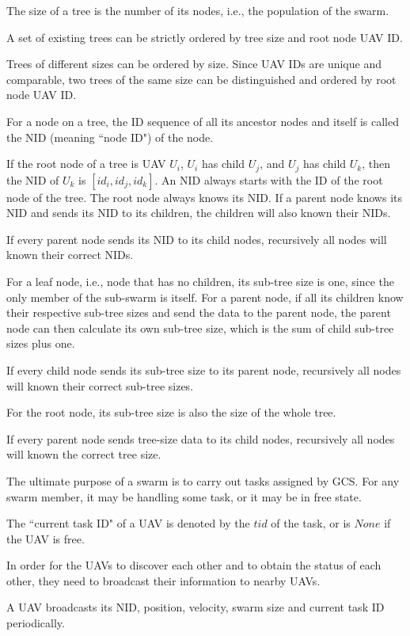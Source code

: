 \begin{remark}
    The size of a tree is the number of its nodes, i.e., the population of the swarm.
\end{remark}
\begin{remark}
    A set of existing trees can be strictly ordered by tree size and root node UAV ID.
\end{remark}
Trees of different sizes can be ordered by size.
Since UAV IDs are unique and comparable,
two trees of the same size can be distinguished and ordered by root node UAV ID.
\begin{remark}
    For a node on a tree, the ID sequence of all its ancestor nodes and itself
    is called the NID (meaning ``node ID") of the node.
\end{remark}
If the root node of a tree is UAV $U_i$, $U_i$ has child $U_j$,
and $U_j$ has child $U_k$, then the NID of $U_k$ is $[id_i, id_j, id_k]$.
An NID always starts with the ID of the root node of the tree.
The root node always knows its NID.
If a parent node knows its NID and sends its NID to its children,
the children will also known their NIDs.
\begin{remark}
    If every parent node sends its NID to its child nodes,
    recursively all nodes will known their correct NIDs.
\end{remark}
For a leaf node, i.e., node that has no children,
its sub-tree size is one, since the only member of the sub-swarm is itself.
For a parent node, if all its children know their respective sub-tree sizes
and send the data to the parent node,
the parent node can then calculate its own sub-tree size,
which is the sum of child sub-tree sizes plus one.
\begin{remark}
    If every child node sends its sub-tree size to its parent node,
    recursively all nodes will known their correct sub-tree sizes.
\end{remark}
For the root node, its sub-tree size is also the size of the whole tree.
\begin{remark}
    If every parent node sends tree-size data to its child nodes,
    recursively all nodes will known the correct tree size.
\end{remark}
The ultimate purpose of a swarm is to carry out tasks assigned by GCS.
For any swarm member, it may be handling some task, or it may be in free state.
\begin{remark}
    The ``current task ID" of a UAV is denoted by the $tid$ of the task,
    or is $None$ if the UAV is free.
\end{remark}
In order for the UAVs to discover each other and to obtain the status of each other,
they need to broadcast their information to nearby UAVs.
\begin{remark}
    A UAV broadcasts its NID, position, velocity, swarm size and current task ID periodically.
\end{remark}

